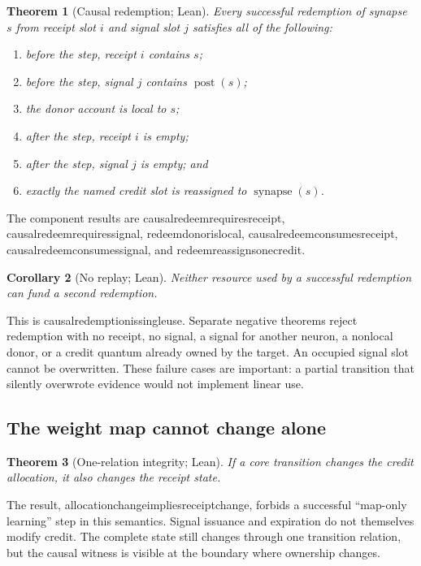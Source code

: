 \documentclass[11pt]{article}
\newtheorem{theorem}{Theorem}[section]
\newtheorem{corollary}[theorem]{Corollary}
\newcommand{\post}{\operatorname{post}}
\newcommand{\synapse}{\operatorname{synapse}}
\newcommand{\leanname}[1]{{\scriptsize\ttfamily
  \def\_{\textunderscore\allowbreak}#1}}
\begin{document}
\begin{theorem}[Causal redemption; Lean]
Every successful redemption of synapse $s$ from receipt slot $i$ and signal
slot $j$ satisfies all of the following:
\begin{enumerate}
\item before the step, receipt $i$ contains $s$;
\item before the step, signal $j$ contains $\post(s)$;
\item the donor account is local to $s$;
\item after the step, receipt $i$ is empty;
\item after the step, signal $j$ is empty; and
\item exactly the named credit slot is reassigned to $\synapse(s)$.
\end{enumerate}
\end{theorem}

The component results are
\leanname{causal\_redeem\_requires\_receipt},
\leanname{causal\_redeem\_requires\_signal},
\leanname{redeem\_donor\_is\_local},
\leanname{causal\_redeem\_consumes\_receipt},
\leanname{causal\_redeem\_consumes\_signal}, and
\leanname{redeem\_reassigns\_one\_credit}.

\begin{corollary}[No replay; Lean]
Neither resource used by a successful redemption can fund a second redemption.
\end{corollary}

This is \leanname{causal\_redemption\_is\_single\_use}.  Separate negative
theorems reject redemption with no receipt, no signal, a signal for another
neuron, a nonlocal donor, or a credit quantum already owned by the target.
An occupied signal slot cannot be overwritten.  These failure cases are
important: a partial transition that silently overwrote evidence would not
implement linear use.

\subsection{The weight map cannot change alone}

\begin{theorem}[One-relation integrity; Lean]
If a core transition changes the credit allocation, it also changes the
receipt state.
\end{theorem}

The result, \leanname{allocation\_change\_implies\_receipt\_change}, forbids a
successful ``map-only learning'' step in this semantics.  Signal issuance and
expiration do not themselves modify credit.  The complete state still changes
through one transition relation, but the causal witness is visible at the
boundary where ownership changes.
\end{document}
